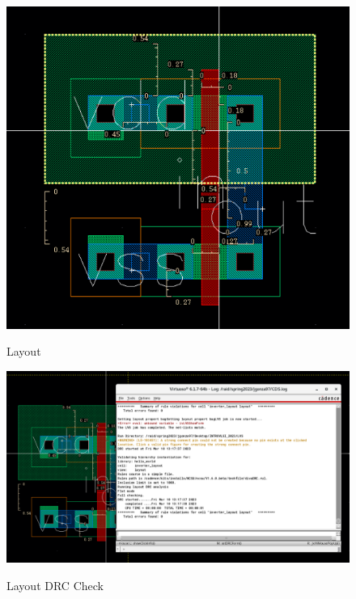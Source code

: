 \documentclass{article}
\begin{document}
\begin{figure}[h]
	\includegraphics[width =\textwidth]{layout.png}
	\label{layout}
	\caption{Layout}
\end{figure}

\begin{figure}[h]
	\includegraphics[width =\textwidth]{layoutDRC.png}
	\label{drc}
	\caption{Layout DRC Check}
\end{figure}
\end{document}
